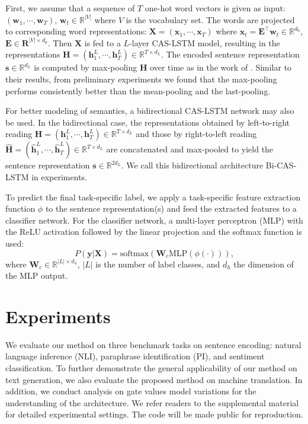 \documentclass[wcp]{jmlr}
\begin{document}
    First, we assume that a sequence of $T$ one-hot word vectors is given as input: $(\mathbf{w}_1, \cdots, \mathbf{w}_T)$, $\mathbf{w}_t \in \mathbb{R}^{|V|}$ where $V$ is the vocabulary set.
    The words are projected to corresponding word representations: $\mathbf{X}=(\mathbf{x}_1, \cdots, \mathbf{x}_T)$ where $\mathbf{x}_{t} = \mathbf{E}^\top \mathbf{w}_t \in \mathbb{R}^{d_0}$, $\mathbf{E}\in \mathbf{R}^{|V| \times d_0}$.
    Then $\mathbf{X}$ is fed to a $L$-layer CAS-LSTM model, resulting in the representations $\mathbf{H}=(\mathbf{h}_1^L, \cdots, \mathbf{h}_T^L)\in \mathbb{R}^{T\times d_L}$.
    The encoded sentence representation $\mathbf{s} \in \mathbb{R}^{d_L}$ is computed by max-pooling $\mathbf{H}$ over time as in the work of \citet{conneau2017infersent}.
    Similar to their results, from preliminary experiments we found that the max-pooling performs consistently better than the mean-pooling and the last-pooling.
    
    For better modeling of semantics, a bidirectional CAS-LSTM network may also be used.
    In the bidirectional case, the representations obtained by left-to-right reading $\mathbf{H}=(\mathbf{h}_1^L, \cdots, \mathbf{h}_T^L) \in \mathbb{R}^{T\times d_L}$
    and those by right-to-left reading $\widehat{\mathbf{H}}=(\widehat{\mathbf{h}}_1^L, \cdots, \widehat{\mathbf{h}}_T^L) \in \mathbb{R}^{T \times d_L}$ are concatenated and max-pooled to yield the sentence representation $\mathbf{s} \in \mathbb{R}^{2d_L}$.
    We call this bidirectional architecture Bi-CAS-LSTM in experiments.
    
    To predict the final task-specific label, we apply a task-specific feature extraction function $\phi$ to the sentence representation(s) and feed the extracted features to a classifier network.
    For the classifier network, a multi-layer perceptron (MLP) with the ReLU activation followed by the linear projection and the softmax function is used:
    \begin{equation}
    P(\mathbf{y}|\mathbf{X}) = \text{softmax}(\mathbf{W}_c\text{MLP}(\phi(\cdot))),
    \end{equation}
    where $\mathbf{W}_c \in \mathbb{R}^{|L|\times d_h}$, $|L|$ is the number of label classes, and $d_h$ the dimension of the MLP output.
    
    
    \section{Experiments}
    \label{sec:experiments}
    We evaluate our method on three benchmark tasks on sentence encoding: natural language inference (NLI), paraphrase identification (PI), and sentiment classification.
    To further demonstrate the general applicability of our method on text generation, we also evaluate the proposed method on machine translation.
    In addition, we conduct analysis on gate values model variations for the understanding of the architecture.
    We refer readers to the supplemental material for detailed experimental settings.
    The code will be made public for reproduction.
    
\end{document}
